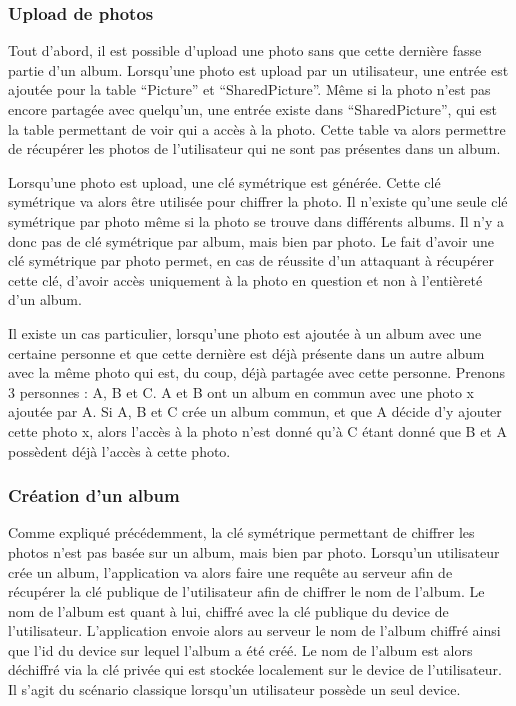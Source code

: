 \documentclass[
  11pt,
  paper=a4,
  ,captions=tableheading
]{scrartcl}
\begin{document}
\hypertarget{upload-de-photos}{%
\subsubsection{Upload de photos}\label{upload-de-photos}}

Tout d’abord, il est possible d’upload une photo sans que cette dernière
fasse partie d’un album. Lorsqu’une photo est upload par un utilisateur,
une entrée est ajoutée pour la table “Picture” et “SharedPicture”. Même
si la photo n’est pas encore partagée avec quelqu’un, une entrée existe
dans “SharedPicture”, qui est la table permettant de voir qui a accès à
la photo. Cette table va alors permettre de récupérer les photos de
l’utilisateur qui ne sont pas présentes dans un album.

Lorsqu’une photo est upload, une clé symétrique est générée. Cette clé
symétrique va alors être utilisée pour chiffrer la photo. Il n’existe
qu’une seule clé symétrique par photo même si la photo se trouve dans
différents albums. Il n’y a donc pas de clé symétrique par album, mais
bien par photo. Le fait d’avoir une clé symétrique par photo permet, en
cas de réussite d’un attaquant à récupérer cette clé, d’avoir accès
uniquement à la photo en question et non à l’entièreté d’un album.

Il existe un cas particulier, lorsqu’une photo est ajoutée à un album
avec une certaine personne et que cette dernière est déjà présente dans
un autre album avec la même photo qui est, du coup, déjà partagée avec
cette personne. Prenons 3 personnes : A, B et C. A et B ont un album en
commun avec une photo x ajoutée par A. Si A, B et C crée un album
commun, et que A décide d’y ajouter cette photo x, alors l’accès à la
photo n’est donné qu’à C étant donné que B et A possèdent déjà l’accès à
cette photo.

\newpage

\hypertarget{cruxe9ation-dun-album}{%
\subsubsection{Création d’un album}\label{cruxe9ation-dun-album}}

Comme expliqué précédemment, la clé symétrique permettant de chiffrer
les photos n’est pas basée sur un album, mais bien par photo. Lorsqu’un
utilisateur crée un album, l’application va alors faire une requête au
serveur afin de récupérer la clé publique de l’utilisateur afin de
chiffrer le nom de l’album. Le nom de l’album est quant à lui, chiffré
avec la clé publique du device de l’utilisateur. L’application envoie
alors au serveur le nom de l’album chiffré ainsi que l’id du device sur
lequel l’album a été créé. Le nom de l’album est alors déchiffré via la
clé privée qui est stockée localement sur le device de l’utilisateur. Il
s’agit du scénario classique lorsqu’un utilisateur possède un seul
device.
\end{document}
